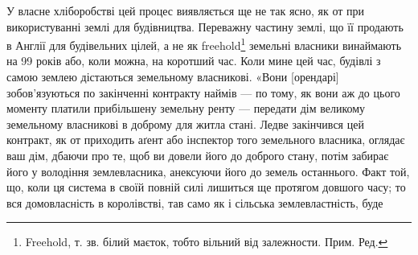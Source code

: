 У власне хліборобстві цей процес виявляється ще не так ясно, як
от при використуванні землі для будівництва. Переважну частину землі, що її
продають в Англії для будівельних цілей, а не як freehold\footnote*{
Freehold, т. зв. білий маєток, тобто вільний від залежности. Прим. Ред.
} земельні власники
винаймають на 99 років або, коли можна, на коротший час. Коли мине цей
час, будівлі з самою землею дістаються земельному власникові. «Вони [орендарі]
зобов’язуються по закінченні контракту наймів — по тому, як вони аж до цього
моменту платили прибільшену земельну ренту — передати дім великому земельному
власникові в доброму для житла стані. Ледве закінчився цей контракт,
як от приходить аґент або інспектор того земельного власника, оглядає ваш
дім, дбаючи про те, щоб ви довели його до доброго стану, потім забирає його
у володіння землевласника, анексуючи його до земель останнього. Факт той, що,
коли ця система в своїй повній силі лишиться ще протягом довшого часу; то
вся домовласність в королівстві, тав само як і сільська землевластність, буде
\parbreak{}  %

